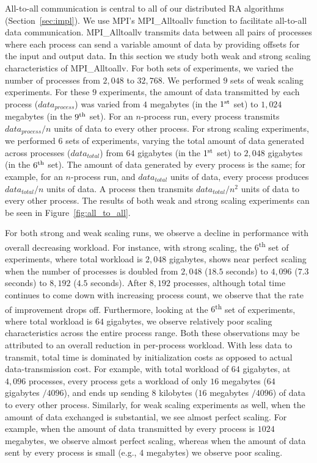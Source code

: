 All-to-all communication is central to all of our distributed RA algorithms (Section~\ref{sec:impl}).
We use MPI's MPI\_Alltoallv function to facilitate all-to-all data communication.
MPI\_Alltoallv transmits data between all pairs of processes where each process can send a variable amount of data by providing offsets for the input and output data. In this section we study both weak and strong scaling characteristics of MPI\_Alltoallv.
For both sets of experiments, we varied the number of processes from $2,\!048$ to $32,\!768$. We performed $9$ sets of weak scaling experiments. For these $9$ experiments, the amount of data transmitted by each process ($data_{process}$) was varied from $4$ megabytes (in the $1\textsuperscript{st}$ set) to $1,024$ megabytes (in the $9\textsuperscript{th}$ set). For an $n$-process run, every process transmits $\mathit{data}_\mathit{process}/n$ units of data to every other process. For strong scaling experiments, we performed 6 sets of experiments, varying the total amount of data generated across processes ($data_{total}$) from $64$ gigabytes (in the $1\textsuperscript{st}$ set) to $2,\!048$ gigabytes (in the $6\textsuperscript{th}$ set). The amount of data generated by every process is the same; for example, for an $n$-process run, and $\mathit{data}_\mathit{total}$ units of data, every process produces $\mathit{data}_\mathit{total}/n$ units of data. A process then transmits $\mathit{data}_\mathit{total}/{n^2}$ units of data to every other process. The results of both weak and strong scaling experiments can be seen in Figure~\ref{fig:all_to_all}.

For both strong and weak scaling runs, we observe a decline in performance with overall decreasing workload. For instance, with strong scaling, the $6$\textsuperscript{th} set of experiments, where total workload is $2,048$ gigabytes, shows near perfect scaling when the number of processes is doubled from $2,\!048$ ($18.5$ seconds) to $4,\!096$ ($7.3$ seconds) to $8,\!192$ ($4.5$ seconds). After $8,192$ processes, although total time continues to come down with increasing process count, we observe that the rate of improvement drops off. Furthermore, looking at the $6$\textsuperscript{th} set of experiments, where total workload is $64$ gigabytes, we observe relatively poor scaling characteristics across the entire process range. Both these observations may be attributed to an overall reduction in per-process workload. With less data to transmit, total time is dominated by initialization costs as opposed to actual data-transmission cost. For example, with total workload of $64$ gigabytes, at $4,096$ processes, every process gets a workload of only $16$ megabytes ($64$ gigabytes $/ 4096$), and ends up sending $8$ kilobytes ($16$ megabytes $/ 4096$) of data to every other process. Similarly, for weak scaling experiments as well, when the amount of data exchanged is substantial, we see almost perfect scaling. For example, when the amount of data transmitted by every process is $1024$ megabytes, we observe almost perfect scaling, whereas when the amount of data sent by every process is small (e.g., $4$ megabytes) we observe poor scaling.

